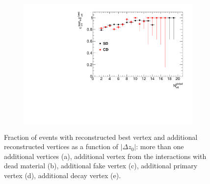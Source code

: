 \begin{figure}[H]
{			\begin{subfigure}[b]{\linewidth}{
					{\includegraphics[width=\linewidth, page=34]{graphics/vertexing/vertexEffi.pdf}}}
			\end{subfigure}
		}
	\caption[Fraction of events with reconstructed best vertex and additional reconstructed vertices  as a function of $|\Delta z_0|$]{Fraction of events with reconstructed best vertex and additional reconstructed vertices as a function of $|\Delta z_0|$: more than one additional vertices (a), additional vertex from the interactions with dead material (b), additional fake vertex (c), additional primary vertex (d), additional decay vertex (e).}
	\label{fig:vertexAdditionalZ}
\end{figure}
